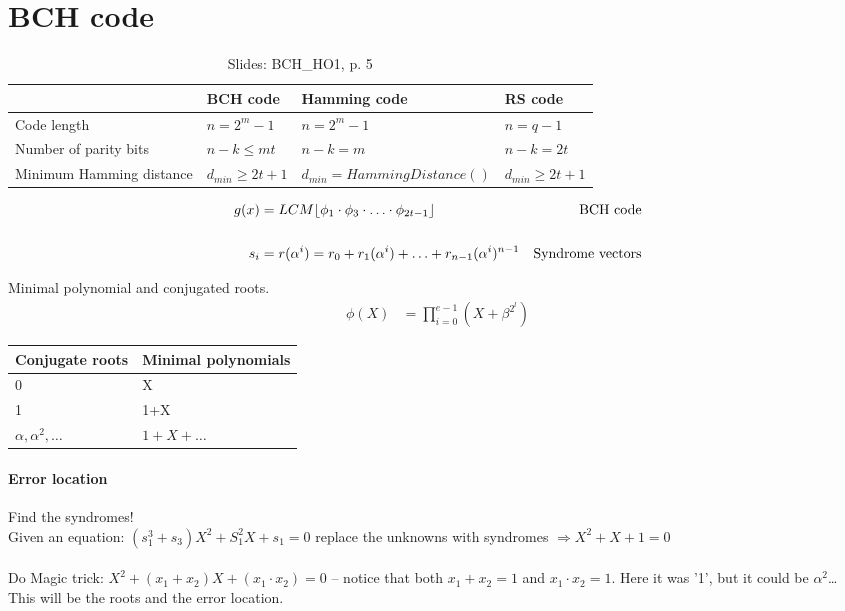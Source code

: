\documentclass[Main]{subfiles}
\begin{document}
\section{BCH code}
\begin{table}[H]
\centering
\begin{tabular}{llll}
	& BCH code & Hamming code & RS code\\\hline
Code length & $n=2^m-1$ & $n = 2^m-1$ & $n=q-1$\\
Number of parity bits & $n-k \leq mt$ & $n-k=m$ & $n-k=2t$\\
Minimum Hamming distance & $d_{min} \geq 2t+1$ & $d_{min}=HammingDistance() $ & $d_{min} \geq 2t+1$
\end{tabular}
\caption{Slides: BCH\_HO1, p. 5}
\end{table}

\begin{align*}
g(x) &= LCM \lfloor \phi_1 \cdot \phi_3 \cdot \ldots \cdot \phi_{2t-1}\rfloor & \text{BCH code}
\\
\\
s_i &=r( \alpha^i)=r_0+r_1(\alpha^i)+\ldots+r_{n-1}(\alpha^i)^{n-1} & \text{Syndrome vectors}
\end{align*}

Minimal polynomial and conjugated roots.
\begin{align*}
\phi (X) &= \prod_{i=0}^{e-1}(X + \beta^{2^l})
\end{align*}

\begin{table}[H]
\centering
\begin{tabular}{l l}
\hline
Conjugate roots & Minimal polynomials \\\hline
0 & X \\
1 & 1+X \\
$\alpha, \alpha^{2}, \ldots$ & $1+X+\ldots$ \\
\hline
\end{tabular}
\end{table}

\paragraph{Error location}
Find the syndromes!
\\
Given an equation: $(s_1^3+s_3)X^2+S_1^2X+s_1= 0$ replace the unknowns with syndromes $\Rightarrow X^2+X+1=0$
\\
\\
Do Magic trick:
$X^2+(x_1+x_2)X+(x_1\cdot x_2) = 0$ -- notice that both $x_1+x_2=1$ and $x_1 \cdot x_2 = 1$. Here it was '1', but it could be $\alpha^2$\dots
\\
This will be the roots and the error location.
\end{document}
